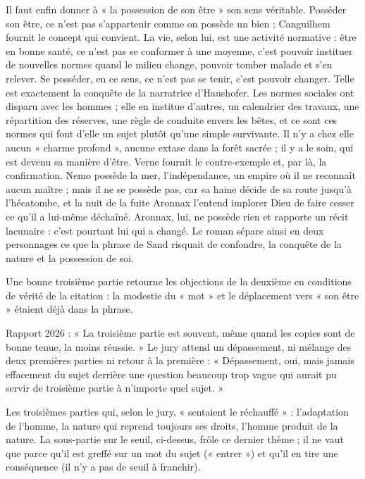\documentclass[11pt,a4paper]{article}
\begin{document}
Il faut enfin donner à « la possession de son être » son sens véritable. Posséder son être, ce n'est pas s'appartenir comme on possède un bien ; Canguilhem fournit le concept qui convient. La vie, selon lui, est une activité normative : être en bonne santé, ce n'est pas se conformer à une moyenne, c'est pouvoir instituer de nouvelles normes quand le milieu change, pouvoir tomber malade et s'en relever. Se posséder, en ce sens, ce n'est pas se tenir, c'est pouvoir changer. Telle est exactement la conquête de la narratrice d'Haushofer. Les normes sociales ont disparu avec les hommes ; elle en institue d'autres, un calendrier des travaux, une répartition des réserves, une règle de conduite envers les bêtes, et ce sont ces normes qui font d'elle un sujet plutôt qu'une simple survivante. Il n'y a chez elle aucun « charme profond », aucune extase dans la forêt sacrée ; il y a le soin, qui est devenu sa manière d'être. Verne fournit le contre-exemple et, par là, la confirmation. Nemo possède la mer, l'indépendance, un empire où il ne reconnaît aucun maître ; mais il ne se possède pas, car sa haine décide de sa route jusqu'à l'hécatombe, et la nuit de la fuite Aronnax l'entend implorer Dieu de faire cesser ce qu'il a lui-même déchaîné. Aronnax, lui, ne possède rien et rapporte un récit lacunaire : c'est pourtant lui qui a changé. Le roman sépare ainsi en deux personnages ce que la phrase de Sand risquait de confondre, la conquête de la nature et la possession de soi.

\begin{methode}

Une bonne troisième partie retourne les objections de la deuxième en conditions de vérité de la citation : la modestie du « mot » et le déplacement vers « son être » étaient déjà dans la phrase.

\end{methode}

\begin{jury}

Rapport 2026 : « La troisième partie est souvent, même quand les copies sont de bonne tenue, la moins réussie. » Le jury attend un dépassement, ni mélange des deux premières parties ni retour à la première : « Dépassement, oui, mais jamais effacement du sujet derrière une question beaucoup trop vague qui aurait pu servir de troisième partie à n'importe quel sujet. »

\end{jury}

\begin{piege}

Les troisièmes parties qui, selon le jury, « sentaient le réchauffé » : l'adaptation de l'homme, la nature qui reprend toujours ses droits, l'homme produit de la nature. La sous-partie sur le seuil, ci-dessus, frôle ce dernier thème ; il ne vaut que parce qu'il est greffé sur un mot du sujet (« entrer ») et qu'il en tire une conséquence (il n'y a pas de seuil à franchir).

\end{piege}
\end{document}
